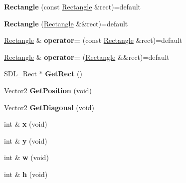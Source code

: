 \begin{DoxyCompactItemize}
{\bfseries Rectangle} (const \mbox{\hyperlink{classinferno_1_1graphics_1_1_rectangle}{Rectangle}} \&rect)=default
\item 
\mbox{\label{classinferno_1_1graphics_1_1_rectangle_a82d817bb84990a7e4099f3a92892c283}} 
{\bfseries Rectangle} (\mbox{\hyperlink{classinferno_1_1graphics_1_1_rectangle}{Rectangle}} \&\&rect)=default
\item 
\mbox{\label{classinferno_1_1graphics_1_1_rectangle_abf9f5dfa2c99428262efbdf579e7a12d}} 
\mbox{\hyperlink{classinferno_1_1graphics_1_1_rectangle}{Rectangle}} \& {\bfseries operator=} (const \mbox{\hyperlink{classinferno_1_1graphics_1_1_rectangle}{Rectangle}} \&rect)=default
\item 
\mbox{\label{classinferno_1_1graphics_1_1_rectangle_adb5ebed14b2f169e868c2b92a91c44fa}} 
\mbox{\hyperlink{classinferno_1_1graphics_1_1_rectangle}{Rectangle}} \& {\bfseries operator=} (\mbox{\hyperlink{classinferno_1_1graphics_1_1_rectangle}{Rectangle}} \&\&rect)=default
\item 
\mbox{\label{classinferno_1_1graphics_1_1_rectangle_a9e387b78a1e65f30f43c8c6fb7dc48fd}} 
S\+D\+L\+\_\+\+Rect $\ast$ {\bfseries Get\+Rect} ()
\item 
\mbox{\label{classinferno_1_1graphics_1_1_rectangle_a692a68e1d5d637deeebb3e720d5e7c4c}} 
Vector2 {\bfseries Get\+Position} (void)
\item 
\mbox{\label{classinferno_1_1graphics_1_1_rectangle_a7cdef92244adc6e3ed90eec613681c48}} 
Vector2 {\bfseries Get\+Diagonal} (void)
\item 
\mbox{\label{classinferno_1_1graphics_1_1_rectangle_a4ea617a6c8ad8e17016c33b403d88e17}} 
int \& {\bfseries x} (void)
\item 
\mbox{\label{classinferno_1_1graphics_1_1_rectangle_a91bd890f58f8ea1396d78e36850edab3}} 
int \& {\bfseries y} (void)
\item 
\mbox{\label{classinferno_1_1graphics_1_1_rectangle_ac69abd232d10ed0fa5c3b1a5374b973f}} 
int \& {\bfseries w} (void)
\item 
\mbox{\label{classinferno_1_1graphics_1_1_rectangle_afcd7bfb62d8ccfa612178ae2a11d3ce8}} 
int \& {\bfseries h} (void)
\end{DoxyCompactItemize}



